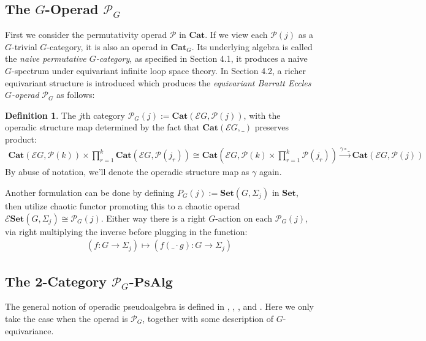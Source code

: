 \documentclass[openany, amssymb, psamsfonts]{amsart}
\theoremstyle{definition}
\newtheorem{defn}{Definition}[section]
\numberwithin{equation}{section}
\newcommand{\Cat}{\mathbf{Cat}} %
\newcommand{\PsAlg}{\mathbf{PsAlg}} %
\newcommand{\Sets}{\mathbf{Set}} %
\newcommand{\cP}{\mathscr{P}} %
\begin{document}
\subsection{The $G$-Operad $\cP_G$}\label{sub_perm_G}
First we consider the permutativity operad $\cP$ in $\Cat$. If we view each $\cP(j)$ as a $G$-trivial $G$-category, it is also an operad in $\Cat_G$. Its underlying algebra is called the \emph{naive permutative $G$-category}, as specified in \cite{GM17} Section 4.1, it produces a naive $G$-spectrum under equivariant infinite loop space theory. In \cite{GM17} Section 4.2, a richer equivariant structure is introduced which produces the \emph{equivariant Barratt Eccles $G$-operad} $\cP_G$ as follows:
\begin{defn}\label{defn_perm_G}
    The $j$th category $\cP_G(j) := \Cat(\mathscr{E}G,\cP(j))$, with the operadic structure map determined by the fact that $\Cat(\mathscr{E}G,\_)$ preserves product:
    \begin{align}
        \Cat(\mathscr{E}G,\cP(k))\times \prod_{r=1}^k\Cat(\mathscr{E}G,\cP(j_r))\cong \Cat\left(\mathscr{E}G,\cP(k)\times \prod_{r=1}^k\cP(j_r)\right)\xrightarrow{\gamma\circ\_}\Cat(\mathscr{E}G,\cP(j))
    \end{align}
    By abuse of notation, we'll denote the operadic structure map as $\gamma$ again.
\end{defn}

Another formulation can be done by defining $P_G(j):= \Sets(G,\Sigma_j)$ in $\Sets$, then utilize chaotic functor promoting this to a chaotic operad $\mathscr{E}\Sets(G,\Sigma_j)\cong \cP_G(j)$. Either way there is a right $G$-action on each $\cP_G(j)$, via right multiplying the inverse before plugging in the function:
\begin{align}
    (f:G\rightarrow\Sigma_j)\mapsto (f(\_\cdot g):G\rightarrow\Sigma_j)
\end{align}

\subsection{The 2-Category $\cP_G$-$\PsAlg$}\label{sub_P_G_psalg}

The general notion of operadic pseudoalgebra is defined in \cite{CG14}, \cite{GMMO20}, \cite{LMRZ26}, and \cite{Y24 }. Here we only take the case when the operad is $\cP_G$, together with some description of $G$-equivariance.
\end{document}
